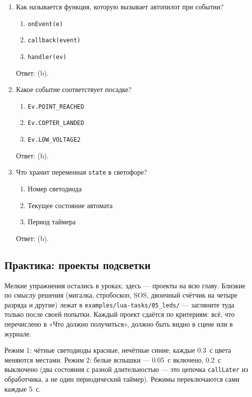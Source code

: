 \begin{enumerate}
\item Как называется функция, которую вызывает автопилот при событии?
  \begin{enumerate}[label=(\alph*)] \item \verb|onEvent(e)| \item \verb|callback(event)| \item \verb|handler(ev)| \end{enumerate}
  Ответ: (b).
\item Какое событие соответствует посадке?
  \begin{enumerate}[label=(\alph*)] \item \verb|Ev.POINT_REACHED| \item \verb|Ev.COPTER_LANDED| \item \verb|Ev.LOW_VOLTAGE2| \end{enumerate}
  Ответ: (b).
\item Что хранит переменная \verb|state| в светофоре?
  \begin{enumerate}[label=(\alph*)] \item Номер светодиода \item Текущее состояние автомата \item Период таймера \end{enumerate}
  Ответ: (b).
\end{enumerate}

\subsection{Практика: проекты подсветки}

Мелкие упражнения остались в уроках; здесь --- проекты на всю главу. Близкие по смыслу решения (мигалка, стробоскоп, SOS, двоичный счётчик на четыре разряда и другие) лежат в \texttt{examples/lua-tasks/05\_leds/} --- загляните туда только после своей попытки. Каждый проект сдаётся по критериям: всё, что перечислено в «Что должно получиться», должно быть видно в сцене или в журнале.

\begin{taskbox}
Режим 1: чётные светодиоды красные, нечётные синие; каждые 0.3~с цвета меняются местами. Режим 2: белые вспышки --- 0.05~с включено, 0.2~с выключено (два состояния с разной длительностью --- это цепочка \verb|callLater| из обработчика, а не один периодический таймер). Режимы переключаются сами каждые 5~с.
\end{taskbox}


